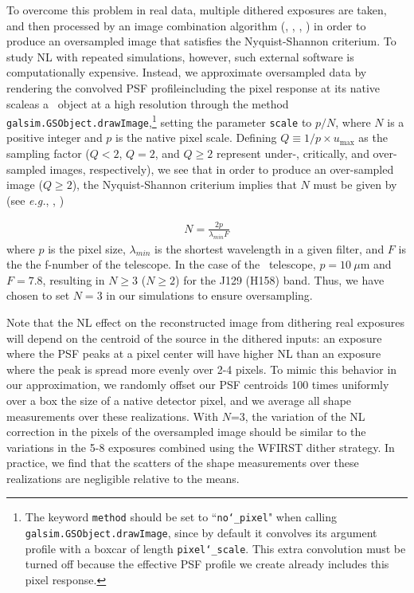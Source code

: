 \documentclass[11pt,preprint,flushrt]{aastex}
\begin{document}
To overcome this problem in real data, multiple dithered exposures are taken, and then processed by an image combination algorithm (\citealt{lauer99b}, \citealt{fruchter02}, \citealt{bertin06}, \citealt{rowe11}) in order to produce an oversampled image that satisfies the Nyquist-Shannon criterium. To study NL with repeated simulations, however, such external software is computationally expensive.  Instead, we approximate oversampled data by rendering the convolved PSF profile\textemdash including the pixel response at its native scale\textemdash as a \gs\ object at a high resolution through the method {\tt{galsim.GSObject.drawImage}},\footnote{The keyword {\tt{method}} should be set to ``{\tt{no\char`_pixel}}" when calling {\tt{galsim.GSObject.drawImage}}, since by default it convolves its argument profile with a boxcar of length {\tt{pixel\char`_scale}}. This extra convolution must be turned off because the effective PSF profile we create already includes this pixel response.} setting the parameter {\tt{scale}} to $p/N$, where $N$ is a positive integer and $p$ is the native pixel scale. 
 Defining $Q\equiv1/p\times u_{\text{max}}$ as the sampling factor ($Q<2$, $Q=2$, and $Q\geq2$ represent under-, critically, and over-sampled images, respectively), we see that in order to produce an over-sampled image ($Q\geq2$), the Nyquist-Shannon criterium implies that $N$ must be given by (see \emph{e.g.}, \citealt{marks09}, \citealt{shapiro13})

\begin{align}
N=\frac{2p}{\lambda_{min} F}
\label{nimages}
\end{align}
where $p$ is the pixel size, $\lambda_{min}$ is the shortest wavelength in a given filter, and $F$ is the the f-number of the telescope. In the case of the \wfa\ telescope, $p=10\ \mu$m and $F=7.8$, resulting in $N\geq3$ ($N\geq2$) for the J129 (H158) band. Thus, we have chosen to set $N=3$ in our simulations
to ensure oversampling.

Note that the NL effect on the reconstructed image from dithering real exposures will depend on the centroid of the source in the dithered inputs: an exposure where the PSF peaks at a pixel center will have higher NL than an exposure where the peak is spread more evenly over 2-4 pixels.  To mimic this behavior in our approximation, we randomly offset our PSF centroids 100 times uniformly over a box the size of a native detector pixel, and we average all shape measurements over these realizations.  With $N$=3, the variation of the NL correction in the pixels of the oversampled image should be similar to the variations in the 5-8 exposures combined using the WFIRST dither strategy.  In practice, we find that the scatters of the shape measurements over these realizations are negligible relative to the means.
\end{document}

